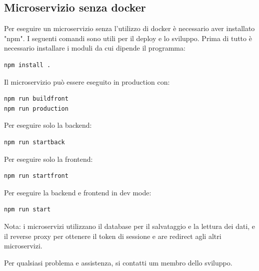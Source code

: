 \documentclass{report}
\begin{document}
\subsection*{Microservizio senza docker}
Per eseguire un microservizio senza l'utilizzo di docker è necessario aver installato "npm". I seguenti comandi sono utili per il deploy e lo sviluppo.
Prima di tutto è necessario installare i moduli da cui dipende il programma:
\begin{verbatim}
npm install .
\end{verbatim}
Il microservizio può essere eseguito in production con:
\begin{verbatim}
npm run buildfront
npm run production
\end{verbatim}
Per eseguire solo la backend:
\begin{verbatim}
npm run startback
\end{verbatim}
Per eseguire solo la frontend:
\begin{verbatim}
npm run startfront
\end{verbatim}
Per eseguire la backend e frontend in dev mode:
\begin{verbatim}
npm run start
\end{verbatim}
Nota: i microservizi utilizzano il database per il salvataggio e la lettura dei dati, e il reverse proxy per ottenere il token di sessione e are redirect agli altri microservizi.

Per qualsiasi problema e assistenza, si contatti um membro dello sviluppo.
\end{document}
